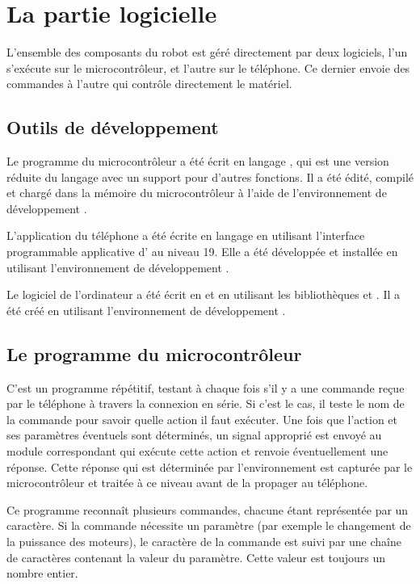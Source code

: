 \section{La partie logicielle}

L'ensemble des composants du robot est géré directement par deux logiciels, l'un
s'exécute sur le microcontrôleur, et l'autre sur le téléphone. Ce dernier
envoie des commandes à l'autre qui contrôle directement le matériel.

\subsection{Outils de développement}

Le programme du microcontrôleur a été écrit en langage , qui est une version
réduite du langage  avec un support pour d'autres fonctions.
Il a été édité, compilé et chargé dans la mémoire du microcontrôleur à l'aide de
l'environnement de développement .

L'application du téléphone a été écrite en langage  en utilisant
l'interface programmable applicative d' au niveau 19. Elle a été développée et installée
en utilisant l'environnement de développement .

Le logiciel de l'ordinateur a été écrit en  et en utilisant les
bibliothèques  et . Il a été créé en utilisant
l'environnement de développement .

\subsection{Le programme du microcontrôleur}

C'est un programme répétitif, testant à chaque fois s'il y a
une commande reçue par le téléphone à travers la connexion en série. Si c'est le cas,
il teste le nom de la commande pour savoir quelle action il faut exécuter.
Une fois que l'action et ses paramètres éventuels sont déterminés, un signal
approprié est envoyé au module correspondant qui exécute cette action et renvoie
éventuellement une réponse. Cette réponse qui est déterminée par l'environnement
est capturée par le microcontrôleur et traitée à ce niveau avant de la propager
au téléphone.

Ce programme reconnaît plusieurs commandes, chacune étant représentée par un
caractère. Si la commande nécessite un paramètre (par exemple le changement de la
puissance des moteurs), le caractère de la commande est suivi par une chaîne de
caractères contenant la valeur du paramètre. Cette valeur est toujours un nombre
entier.

